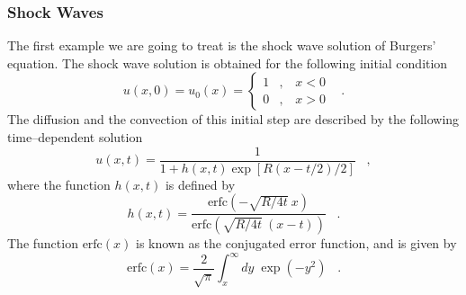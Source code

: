 \subsubsection{Shock Waves}
The first example we are going to treat is the shock wave
solution of Burgers'
equation. The shock wave solution is obtained for the following
initial
condition 
\begin{equation}                                             \label{INITSH}
u(x,0) = u_0(x) = \left\{ \begin{array}{rcl}
                        1 & , \;\;\; x < 0 \\
                        0 & , \;\;\; x > 0
                        \end{array} \right. \;\;\; .
\end{equation}
The diffusion and the convection of this initial step are described
by the following time--dependent solution
\begin{equation}
\label{SHOCK}
u(x,t) =
\frac{1}{1+h(x,t) \exp \left[ R \left( x-t/2 \right) /2 \right] }
\;\;\; ,
\end{equation}
where the function $h(x,t)$ is defined by
\begin{equation}
h(x,t) = \frac{ \mbox{erfc} \left( -\sqrt{R/4t} \: x \right)}
   {\mbox{erfc} \left( \sqrt{R/4t} \: \left( x-t \right) \right)}
              \;\;\; .
\end{equation}
The function $\mbox{erfc}(x)$ is known as the conjugated error
function, and
is given by
\begin{equation}
\mbox{erfc}(x) = \frac{2}{\sqrt{\pi}} \int_x^{\infty} dy \;
                   \exp \left(-y^2 \right) \;\;\; .
\end{equation}


